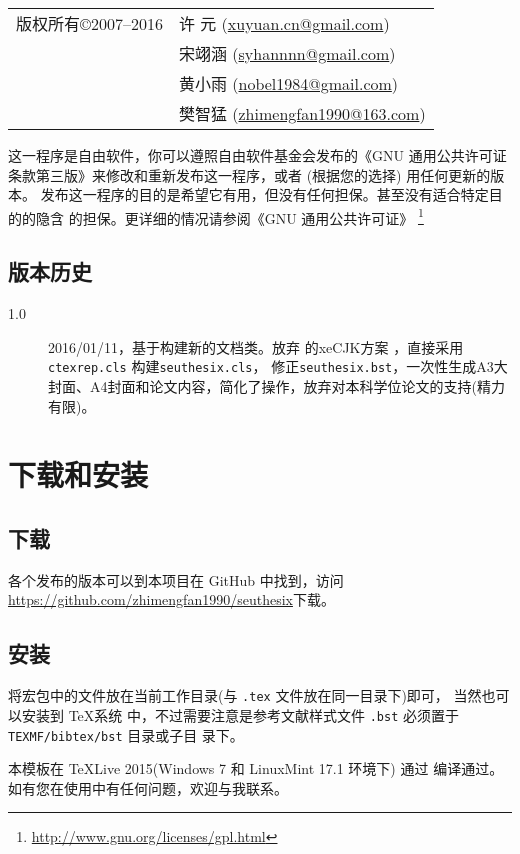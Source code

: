 ﻿\documentclass[figurelist,tablelist,algorithmlist,nomlist,masters]{seuthesix}
\begin{document}
\begin{tabular}{rl}
版权所有\copyright 2007--2016 & 许 元 (\url{xuyuan.cn@gmail.com})\\
 &宋翊涵 (\url{syhannnn@gmail.com})\\
 & 黄小雨 (\url{nobel1984@gmail.com})\\
 & 樊智猛 (\url{zhimengfan1990@163.com})
\end{tabular}
\par
这一程序是自由软件，你可以遵照自由软件基金会发布的《GNU 通用公共许可证
条款第三版》来修改和重新发布这一程序，或者 (根据您的选择) 用任何更新的版本。
发布这一程序的目的是希望它有用，但没有任何担保。甚至没有适合特定目的的隐含
的担保。更详细的情况请参阅《GNU 通用公共许可证》
\footnote{\url{http://www.gnu.org/licenses/gpl.html}}

\section{版本历史}
\begin{description}
\item[1.0] 2016/01/11，基于\seuthesis 构建新的\seuthesix 文档类。放弃\seuthesis 
的xeCJK方案 ，直接采用\verb+ctexrep.cls+ 构建\verb+seuthesix.cls+，
修正\verb+seuthesix.bst+，一次性生成A3大封面、A4封面和论文内容，简化了操作，放弃对本科学位论文的支持(精力有限)。
\end{description}

\chapter{下载和安装}
\section{下载}
各个发布的版本可以到本项目在 GitHub 中找到，访问
 \url{https://github.com/zhimengfan1990/seuthesix}下载。
\section{安装}
将宏包中的文件放在当前工作目录(与 \verb+.tex+ 文件放在同一目录下)即可，
当然也可以安装到 \TeX 系统
中，不过需要注意是参考文献样式文件 \verb+.bst+ 必须置于 \verb+TEXMF/bibtex/bst+ 目录或子目
录下。

本模板在 \TeX{Live} 2015(Windows 7 和 LinuxMint 17.1 环境下) 通过 编译通过。
如有您在使用中有任何问题，欢迎与我联系。
\end{document}
